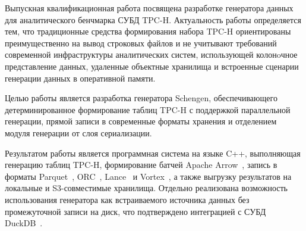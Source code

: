 Выпускная квалификационная работа посвящена разработке генератора данных для
аналитического бенчмарка СУБД TPC-H. Актуальность работы определяется тем, что
традиционные средства формирования набора TPC-H ориентированы преимущественно на
вывод строковых файлов и не учитывают требований современной инфраструктуры
аналитических систем, использующей колонoчное представление данных, удаленные
объектные хранилища и встроенные сценарии генерации данных в оперативной
памяти.

Целью работы является разработка генератора Schengen, обеспечивающего
детерминированное формирование таблиц TPC-H с поддержкой параллельной
генерации, прямой записи в современные форматы хранения и отделением модуля
генерации от слоя сериализации.

Результатом работы является программная система на языке C++, выполняющая
генерацию таблиц TPC-H, формирование батчей Apache Arrow~\cite{apache-arrow},
запись в форматы Parquet~\cite{apache-parquet},
ORC~\cite{apache-orc}, Lance~\cite{lance-format} и
Vortex~\cite{vortex-format}, а также выгрузку результатов на локальные
и S3-совместимые хранилища. Отдельно реализована возможность
использования генератора как встраиваемого источника данных без промежуточной
записи на диск, что подтверждено интеграцией с СУБД
DuckDB~\cite{schengen-duckdb-repo}.
